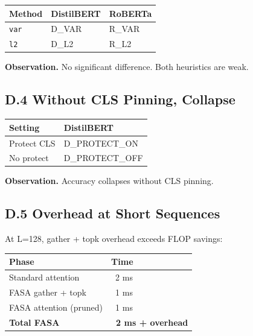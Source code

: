 \begin{table}[H]
\centering
\small
\begin{tabular}{lll}
\toprule
\textbf{Method} & \textbf{DistilBERT} & \textbf{RoBERTa} \\
\midrule
\texttt{var} & {{D\_VAR}} & {{R\_VAR}} \\
\texttt{l2} & {{D\_L2}} & {{R\_L2}} \\
\bottomrule
\end{tabular}
\end{table}

\textbf{Observation.} No significant difference. Both heuristics are weak.

\subsection{D.4 Without CLS Pinning, Collapse}

\begin{table}[H]
\centering
\small
\begin{tabular}{ll}
\toprule
\textbf{Setting} & \textbf{DistilBERT} \\
\midrule
Protect CLS & {{D\_PROTECT\_ON}} \\
No protect & {{D\_PROTECT\_OFF}} \\
\bottomrule
\end{tabular}
\end{table}

\textbf{Observation.} Accuracy collapses without CLS pinning.

\subsection{D.5 Overhead at Short Sequences}

At L=128, gather + topk overhead exceeds FLOP savings:

\begin{table}[H]
\centering
\small
\begin{tabular}{ll}
\toprule
\textbf{Phase} & \textbf{Time} \\
\midrule
Standard attention & ~2 ms \\
FASA gather + topk & ~1 ms \\
FASA attention (pruned) & ~1 ms \\
\textbf{Total FASA} & \textbf{~2 ms + overhead} \\
\bottomrule
\end{tabular}
\end{table}

